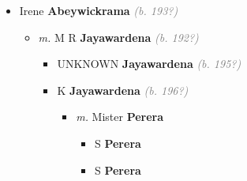 \documentclass[10pt, openany]{book}
\begin{document}
\begin{itemize}
{\begin{itemize}
{\begin{itemize}
{\begin{itemize}
{\begin{itemize}
{\begin{itemize}
{ }
\end{itemize}}
\end{itemize}
  }
\item{Saroj \textbf{Jayasinghe} \textcolor{gray}{\textit{(b. 195?)}} \textcolor{slmaroon}{\textit{Professor at the Faculty of Medicine, Colombo (\footnote{\url{https://cmb.ac.lk/member/professor-saroj-jayasinghe}}).}}
\begin{itemize}
\item{\textit{m.} B \textbf{Unknown} \textcolor{slorange}{\textit{}}   \label{couple:00000341:00000861} \begin{itemize}
\item{Sayumi \textbf{Jayasinghe} \textcolor{slorange}{\textit{}}
 }
\item{Shyam \textbf{Jayasinghe} \textcolor{slorange}{\textit{}} \textcolor{slmaroon}{\textit{Sales Representative (\footnote{\url{https://au.linkedin.com/in/shyam-jayasinghe-5332b914}}).}}
 }
\end{itemize}}
\end{itemize}
 }
\end{itemize}}
\end{itemize}
  }
\item{Irene \textbf{Abeywickrama} \textcolor{gray}{\textit{(b. 193?)}}
\begin{itemize}
\item{\textit{m.} M R \textbf{Jayawardena} \textcolor{gray}{\textit{(b. 192?)}}   \label{couple:00000037:00000356} \begin{itemize}
\item{UNKNOWN \textbf{Jayawardena} \textcolor{gray}{\textit{(b. 195?)}}
 }
\item{K \textbf{Jayawardena} \textcolor{gray}{\textit{(b. 196?)}}
\begin{itemize}
\item{\textit{m.} Mister \textbf{Perera} \textcolor{slorange}{\textit{}}   \label{couple:00000355:00000604} \begin{itemize}
\item{S \textbf{Perera} \textcolor{slorange}{\textit{}}
 }
\item{S \textbf{Perera} \textcolor{slorange}{\textit{}}
 }
\end{itemize}}
\end{itemize}
 }
\end{itemize}}
\end{itemize}
 }
\end{itemize}}
\end{itemize}
   
\end{document}
